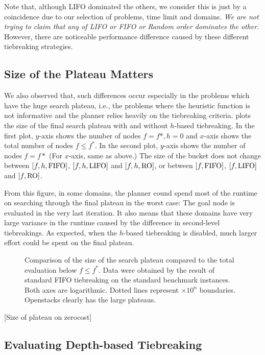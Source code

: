 Note that, although LIFO dominated the others, we consider this is just
by a coincidence due to our selection of problems, time limit and
domains. \emph{We are not trying to claim that any of LIFO or FIFO or
Random order dominates the other}. However, there are noticeable
performance difference caused by these different tiebreaking strategies.

\subsection{Size of the Plateau Matters}

We also observed that, such differences occur especially in the problems which
have the huge search plateau, i.e., the problems where the heuristic
function is not informative and the planner relies heavily on the
tiebreaking criteria.
% 
 plots the size of the final search plateau with and
without $h$-based tiebreaking. In the first plot, $y$-axis shows the
number of nodes $f=f*, h=0$ and $x$-axis shows the total number of nodes
$f\leq f^*$.  In the second plot, $y$-axis shows the number of nodes
$f=f*$ (For $x$-axis, same as above.)  The size of the bucket does not
change between $[f,h,\mbox{FIFO}]$, $[f,h,\mbox{LIFO}]$ and $[f,h,\mbox{RO}]$, or between
$[f,\mbox{FIFO}]$, $[f,\mbox{LIFO}]$ and $[f,\mbox{RO}]$.

From this figure, in some domains, the planner cound spend most of the
runtime on searching through the final plateau in the worst case: The
goal node is evaluated in the very last iteration. It also means that
these domains have very large variance in the runtime caused by the
difference in second-level tiebreakings.  As expected, when the
$h$-based tiebreaking is disabled, much larger effort could be spent on
the final plateau.

\begin{figure}[htb]
 \centering {}
 
 \caption{Comparison of the size of the search plateau compared to the
 total evaluation below $f\leq f^*$. Data were obtained by the result of standard FIFO
 tiebreaking on the standard benchmark instances. Both axes are
 logarithmic. Dotted lines represent $\times 10^n$ boundaries.
 Openstacks clearly has the large plateaus.}  \label{plateau}
\end{figure}

[Size of plateau on zerocost]

\subsection{Evaluating Depth-based Tiebreaking}

